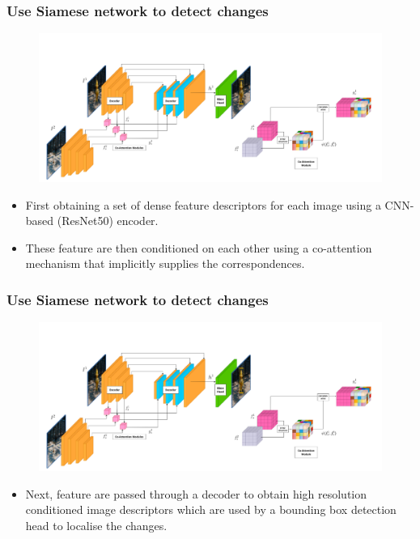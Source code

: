 \documentclass[13.5pt,aspecratio=169, xcolor=dvipsnames]{beamer}
\begin{document}
\begin{frame}
    \onehalfspacing
        \frametitle{Use Siamese network to detect changes}
            \begin{figure}[h]
                \centering
                \includegraphics[scale=0.4]{Siamese_network_architecture.png}
            \end{figure}
        
            \begin{itemize}
                \item First obtaining a set of dense feature
                descriptors for each image using a CNN-based (ResNet50) encoder.
                \item These feature are then conditioned on
                each other using a co-attention mechanism that implicitly
                supplies the correspondences.

            \end{itemize}
    \end{frame}


\begin{frame}
    \onehalfspacing
        \frametitle{Use Siamese network to detect changes}
            \begin{figure}[h]
                \centering
                \includegraphics[scale=0.4]{Siamese_network_architecture.png}
            \end{figure}
        
            \begin{itemize}
                \item Next, feature are passed through a decoder to obtain high
                resolution conditioned image descriptors which are used
                by a bounding box detection head to localise the changes.
            \end{itemize}
    \end{frame}
\end{document}
